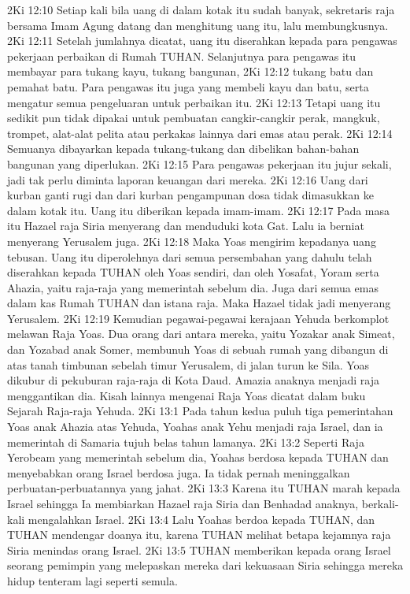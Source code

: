 2Ki 12:10  Setiap kali bila uang di dalam kotak itu sudah banyak, sekretaris raja bersama Imam Agung datang dan menghitung uang itu, lalu membungkusnya.
2Ki 12:11  Setelah jumlahnya dicatat, uang itu diserahkan kepada para pengawas pekerjaan perbaikan di Rumah TUHAN. Selanjutnya para pengawas itu membayar para tukang kayu, tukang bangunan,
2Ki 12:12  tukang batu dan pemahat batu. Para pengawas itu juga yang membeli kayu dan batu, serta mengatur semua pengeluaran untuk perbaikan itu.
2Ki 12:13  Tetapi uang itu sedikit pun tidak dipakai untuk pembuatan cangkir-cangkir perak, mangkuk, trompet, alat-alat pelita atau perkakas lainnya dari emas atau perak.
2Ki 12:14  Semuanya dibayarkan kepada tukang-tukang dan dibelikan bahan-bahan bangunan yang diperlukan.
2Ki 12:15  Para pengawas pekerjaan itu jujur sekali, jadi tak perlu diminta laporan keuangan dari mereka.
2Ki 12:16  Uang dari kurban ganti rugi dan dari kurban pengampunan dosa tidak dimasukkan ke dalam kotak itu. Uang itu diberikan kepada imam-imam.
2Ki 12:17  Pada masa itu Hazael raja Siria menyerang dan menduduki kota Gat. Lalu ia berniat menyerang Yerusalem juga.
2Ki 12:18  Maka Yoas mengirim kepadanya uang tebusan. Uang itu diperolehnya dari semua persembahan yang dahulu telah diserahkan kepada TUHAN oleh Yoas sendiri, dan oleh Yosafat, Yoram serta Ahazia, yaitu raja-raja yang memerintah sebelum dia. Juga dari semua emas dalam kas Rumah TUHAN dan istana raja. Maka Hazael tidak jadi menyerang Yerusalem.
2Ki 12:19  Kemudian pegawai-pegawai kerajaan Yehuda berkomplot melawan Raja Yoas. Dua orang dari antara mereka, yaitu Yozakar anak Simeat, dan Yozabad anak Somer, membunuh Yoas di sebuah rumah yang dibangun di atas tanah timbunan sebelah timur Yerusalem, di jalan turun ke Sila. Yoas dikubur di pekuburan raja-raja di Kota Daud. Amazia anaknya menjadi raja menggantikan dia. Kisah lainnya mengenai Raja Yoas dicatat dalam buku Sejarah Raja-raja Yehuda.
2Ki 13:1  Pada tahun kedua puluh tiga pemerintahan Yoas anak Ahazia atas Yehuda, Yoahas anak Yehu menjadi raja Israel, dan ia memerintah di Samaria tujuh belas tahun lamanya.
2Ki 13:2  Seperti Raja Yerobeam yang memerintah sebelum dia, Yoahas berdosa kepada TUHAN dan menyebabkan orang Israel berdosa juga. Ia tidak pernah meninggalkan perbuatan-perbuatannya yang jahat.
2Ki 13:3  Karena itu TUHAN marah kepada Israel sehingga Ia membiarkan Hazael raja Siria dan Benhadad anaknya, berkali-kali mengalahkan Israel.
2Ki 13:4  Lalu Yoahas berdoa kepada TUHAN, dan TUHAN mendengar doanya itu, karena TUHAN melihat betapa kejamnya raja Siria menindas orang Israel.
2Ki 13:5  TUHAN memberikan kepada orang Israel seorang pemimpin yang melepaskan mereka dari kekuasaan Siria sehingga mereka hidup tenteram lagi seperti semula.
